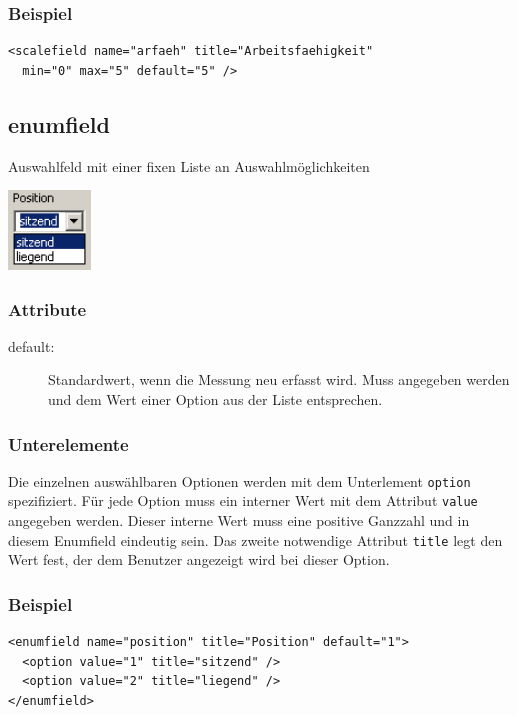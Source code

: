 \documentclass[a4paper]{scrartcl}
\begin{document}
\subsubsection{Beispiel}
\begin{lstlisting}
<scalefield name="arfaeh" title="Arbeitsfaehigkeit"
  min="0" max="5" default="5" />
\end{lstlisting}

\subsection{enumfield}
Auswahlfeld mit einer fixen Liste an Auswahlmöglichkeiten
\begin{center}
    \includegraphics[width=2.2cm]{images/enumfield.png}
\end{center}
\subsubsection{Attribute}
\begin{description}
    \item[default:] Standardwert, wenn die Messung neu erfasst wird. Muss
                    angegeben werden und dem Wert einer Option aus der Liste
                    entsprechen.
\end{description}
\subsubsection{Unterelemente}
Die einzelnen auswählbaren Optionen werden mit dem Unterlement \texttt{option}
spezifiziert. Für jede Option muss ein interner Wert mit dem Attribut
\texttt{value} angegeben werden. Dieser interne Wert muss eine positive Ganzzahl
und in diesem Enumfield eindeutig sein. Das zweite notwendige Attribut
\texttt{title} legt den Wert fest, der dem Benutzer angezeigt wird bei dieser
Option.
\subsubsection{Beispiel}
\begin{lstlisting}
<enumfield name="position" title="Position" default="1">
  <option value="1" title="sitzend" />
  <option value="2" title="liegend" />
</enumfield>
\end{lstlisting}
\end{document}
